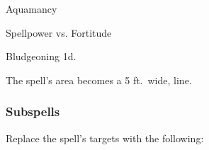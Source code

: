 \newpage
\begin{spellsection}{Aquamancy}

\begin{spellheader}
\end{spellheader}

\begin{spellcontent}

\begin{spelltargetinginfo}




\end{spelltargetinginfo}


\begin{spelleffects}




\begin{spellattack}{Spellpower vs. Fortitude}


\spellsuccess Bludgeoning  \minus1d.


\end{spellattack}





\end{spelleffects}

\end{spellcontent}
\begin{spellfooter}


\end{spellfooter}
\begin{spellsubcontent}


\begin{spellcantrip}
The spell's area becomes a 5 ft.\ wide, \areamed line.
\end{spellcantrip}


\end{spellsubcontent}
\end{spellsection}


\subsubsection{Subspells}





Replace the spell's targets with the following:
\begin{spellcontent}

\begin{augmenttargetinginfo}




\end{augmenttargetinginfo}

\end{spellcontent}





